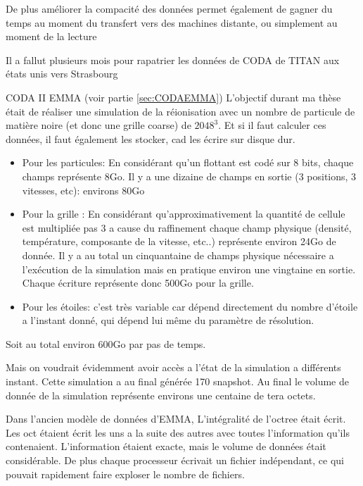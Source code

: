 De plus améliorer la compacité des données permet également de gagner du temps au moment du transfert vers des machines distante, ou simplement au moment de la lecture



Il a fallut plusieurs mois pour rapatrier les données de CODA de TITAN aux états unis vers Strasbourg

CODA II EMMA (voir partie \ref{sec:CODAEMMA})
L'objectif durant ma thèse était de réaliser une simulation de la réionisation avec un nombre de particule de matière noire (et donc une grille coarse) de $2048^3$.
Et si il faut calculer ces données, il faut également les stocker, cad les écrire sur disque dur.

\begin{itemize}
\item Pour les particules:
En considérant qu'un flottant est codé sur 8 bits, chaque champs représente 8Go.
Il y a une dizaine de champs en sortie (3 positions, 3 vitesses, etc): environs 80Go

\item Pour la grille :
En considérant qu'approximativement la quantité de cellule est multipliée pas 3 a cause du raffinement  chaque champ physique (densité, température, composante de la vitesse, etc..) représente environ 24Go de donnée.
Il y a au total un cinquantaine de champs physique nécessaire a l'exécution de la simulation mais en pratique environ une vingtaine en sortie.
Chaque écriture représente donc 500Go pour la grille.

\item Pour les étoiles:
c'est très variable car dépend directement du nombre d'étoile a l'instant donné, qui dépend lui même du paramètre de résolution.
\end{itemize}

Soit au total environ 600Go par pas de temps.

Mais on voudrait évidemment avoir accès a l'état de la simulation a différents instant.
Cette simulation a au final générée 170 snapshot.
Au final le volume de donnée de la simulation représente environs une centaine de tera octets.



Dans l'ancien modèle de données d'EMMA,  
L'intégralité de l'octree était écrit.
Les oct étaient écrit les uns a la suite des autres avec toutes l'information qu'ils contenaient.
L'information étaient exacte, mais le volume de données était considérable.
De plus chaque processeur écrivait un fichier indépendant, ce qui pouvait rapidement faire exploser le nombre de fichiers.



